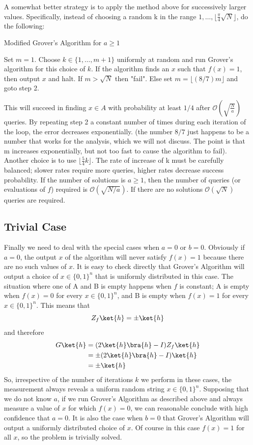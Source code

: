\documentclass[12pt, oneside]{book}
\theoremstyle{definition}
\theoremstyle{definition}
\theoremstyle{remark}
\begin{document}
A somewhat better strategy is to apply the method above for successively larger values. Specifically, instead of choosing a random k in the range $1,\ldots, \lfloor \frac{\pi}{4}\sqrt{N}\rfloor$, do the following:

\begin{algorithm}
    \caption{Modified Grover's Algorithm for $a \geq 1$}
    \begin{algorithmic}[1]
    \State Set $m=1$.
    \State Choose $ k \in \{1,\ldots, m+1\}$ uniformly at random and run Grover's algorithm for this choice of $k$. If the algorithm finds an $x$ such that $f(x)=1$, then output $x$ and halt.
    \State If $m>\sqrt{N}$ then "fail". Else set $m=\lfloor (8/7)m\rfloor$ and goto step 2.
    \end{algorithmic}
\end{algorithm}
This will succeed in finding $x \in A$ with probability at least $1/4$ after $\mathcal{O}(\sqrt{\frac{N}{a}})$ queries. By repeating step 2 a constant number of times during each iteration of the loop, the error decreases exponentially. (the number $8/7$ just happens to be a number that works for the analysis, which we will not discuss. The point is that m increases exponentially, but not too fast to cause the algorithm to fail). Another choice is to use $\lfloor \frac{5}{4}k\rfloor$. The rate of increase of k must be carefully balanced; slower rates require more queries, higher rates decrease success probability. If the number of solutions is $a\geq 1$, then the number of queries (or evaluations of $f$) required is $\mathcal{O}(\sqrt{N/a})$. If there are no solutions $\mathcal{O}(\sqrt{N})$ queries are required.

\subsection{Trivial Case}
Finally we need to deal with the special cases when $a=0$ or $b=0$. Obviously if $a=0$, the output $x$ of the algorithm will never satisfy $f(x)=1$ because there are no such values of $x$. It is easy to check directly that Grover's Algorithm will output a choice of $x \in \{0,1\}^n$ that is uniformly distributed in this case. The situation where one of A and B is empty happens when $f$ is constant; A is empty when $f(x)=0$ for every $x \in \{0,1\}^n$, and B is empty when $f(x)=1$ for every $x\in\{0,1\}^n$. This means that
\[
Z_f\ket{h}=\pm \ket{h}
\]
and therefore
\begin{align*}
    G\ket{h}&=(2\ket{h}\bra{h}-I)Z_f\ket{h}\\
    &=\pm (2\ket{h}\bra{h}-I)\ket{h}\\
    &=\pm \ket{h}
\end{align*}
So, irrespective of the number of iterations $k$ we perform in these cases, the measurement always reveals a uniform random string $x \in \{0,1\}^n$.
Supposing that we do not know $a$, if we run Grover's Algorithm as described above and always measure a value of $x$ for which $f(x)=0$, we can reasonable conclude with high confidence that $a=0$. It is also the case when $b=0$ that Grover's Algorithm will output a uniformly distributed choice of $x$. Of course in this case $f(x)=1$ for all $x$, so the problem is trivially solved.
\end{document}
